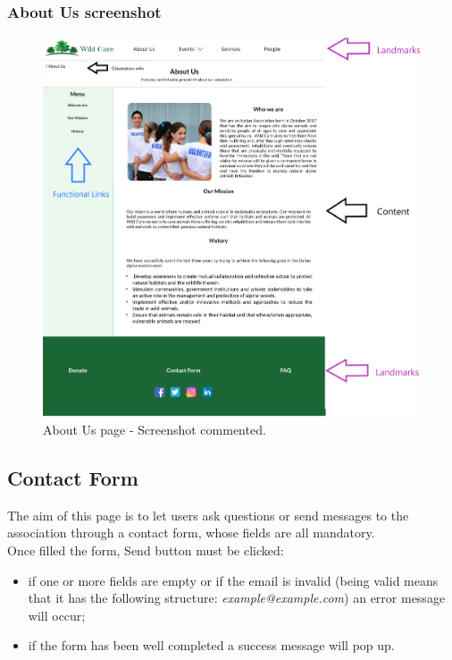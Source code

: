 \subsubsection{About Us screenshot}
\begin{figure}[h!]
	\centering
	\begin{minipage}[b]{1\textwidth}
    		\includegraphics[width=\textwidth]{./assets/mockups/aboutus_commented.png}
		\caption{About Us page - Screenshot commented.}
	\end{minipage}
\end{figure}
\FloatBarrier

\clearpage


\subsection{Contact Form}
The aim of this page is to let users ask questions or send messages to the association through a contact form, whose fields are all mandatory. \\
Once filled the form, Send button must be clicked:
\begin{itemize}
	\item if one or more fields are empty or if the email is invalid (being valid means that it has the following structure: 				\emph{example@example.com}) an error message will occur;
	\item if the form has been well completed a success message will pop up.
\end{itemize}

